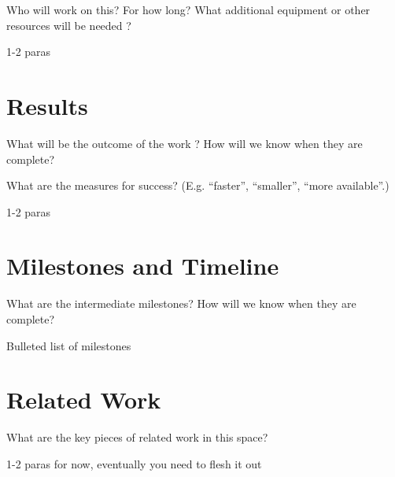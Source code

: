 \documentclass[twocolumn,10pt]{article}
\begin{document}
Who will work on this? For how long? What additional
equipment or other resources will be needed ?

1-2 paras


\section{Results}

What will be the outcome of the work ?  How will we know when they are
complete?

What are the measures for success? (E.g. “faster”,
“smaller”, “more available”.) 


1-2 paras

\section{Milestones and Timeline}

 What are the intermediate
milestones? How will we know when they are
complete?

Bulleted list of milestones

\section{Related Work}

What are the key pieces of related work in this space?

1-2 paras for now, eventually you need to flesh it out


{
\footnotesize
\raggedright


}

%
\end{document}
